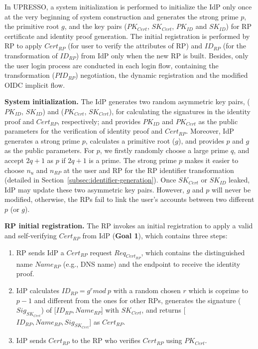 In UPRESSO, a system initialization is performed to initialize the IdP only once at the very beginning of system construction and generates the strong prime $p$, the primitive root $g$, and the key pairs ($PK_{Cert}$, $SK_{Cert}$, $PK_{ID}$ and $SK_{ID}$) for RP certificate and identity proof generation. The initial registration is performed by RP to apply $Cert_{RP}$ (for user to verify the attributes of RP) and $ID_{RP}$ (for the transformation of $ID_{RP}$) from IdP only when the new RP is built.
Besides, only the user login process are conducted in each login flow, containing the transformation ($PID_{RP}$) negotiation, the dynamic registration and the modified OIDC implicit flow.

\vspace{1mm}\noindent \textbf{System initialization.} The IdP generates two random asymmetric key pairs, ($PK_{ID}$, $SK_{ID}$) and ($PK_{Cert}$, $SK_{Cert}$),
for calculating the signatures in the identity proof and $Cert_{RP}$, respectively;
and provides $PK_{ID}$ and $PK_{Cert}$ as the public parameters for the verification of identity proof and $Cert_{RP}$.
Moreover, IdP generates a strong prime $p$, calculates  a primitive root ($g$), and provides $p$ and $g$ as the public parameters.
For $p$, we firstly randomly choose a large prime $q$, and accept  $2q+1$ as $p$ if $2q+1$ is a prime.
The strong prime $p$ makes it easier to choose $n_{u}$ and $n_{RP}$ at the user and RP for the RP identifier transformation (detailed in  Section~\ref{subsec:identifier-generation}). %
Once $SK_{Cert}$ or $SK_{ID}$ leaked, IdP may update these two asymmetric key pairs.
However, $g$ and $p$ will never be modified, otherwise, the RPs fail to link the user's accounts between two different $p$ (or $g$).


\vspace{1mm}\noindent\textbf{RP initial registration.}
The RP invokes an initial registration to apply a valid and self-verifying $Cert_{RP}$ from IdP (\textbf{Goal 1}),
 which contains three steps:

\begin{enumerate}
\item RP sends IdP a $Cert_{RP}$ request $Req_{Cert_{RP}}$, which contains the distinguished name $Name_{RP}$ (e.g., DNS name) and the endpoint to receive the identity proof.
\item IdP calculates $ID_{RP} = g^r mod \ p$ with a random chosen $r$ which is coprime to $p-1$ and different from the ones for other RPs,  generates the signature ($Sig_{SK_{Cert}}$) of [$ID_{RP}, Name_{RP}$] with $SK_{Cert}$, and returns [$ID_{RP}, Name_{RP}, Sig_{SK_{Cert}}$] as $Cert_{RP}$.
\item IdP sends $Cert_{RP}$ to the RP who verifies $Cert_{RP}$ using $PK_{Cert}$.
\end{enumerate}



